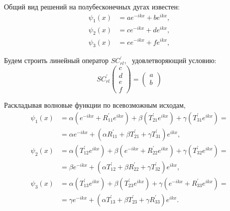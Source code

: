 \documentclass[a4 paper, 12 pt]{extarticle}
\begin{document}
   Общий вид решений на полубесконечных дугах известен:
   \begin{equation}
   \label{GeneralizedSolution1}
   \begin{split}
   \psi_1\left(x\right) &= a e^{-ikx} + b e^{ikx}, \\
   \psi_2\left(x\right) &= c e^{-ikx} + d e^{ikx}, \\
   \psi_3\left(x\right) &= e e^{-ikx} + f e^{ikx},
   \end{split}
   \end{equation}
   
   Будем строить линейный оператор $SC_{rl}^\prime$, \ удовлетворяющий условию:
   \[SC_{rl}^\prime\left(
   \begin{array}{c}
   c \\
   d \\
   e \\
   f
   \end{array}\right) = \left(\begin{array}{c}
   a \\
   b
   \end{array}\right)\]
   
   Раскладывая волновые функции по всевозможным исходам,
   \begin{equation}
   \label{GeneralizedSolution2}
   \begin{aligned}
   \psi_1(x) &= \alpha\left(e^{-ikx} + R_{11}^\prime e^{ikx}\right) + \beta\left(T_{21}^\prime e^{ikx}\right) + \gamma \left(T_{31}^\prime e^{ikx}\right) = \\
   &= \alpha e^{-ikx} + \left(\alpha R_{11}^\prime  + \beta T_{21}^\prime  + \gamma T_{31}^\prime \right) e^{ikx}, \\
   \psi_2(x) &= \alpha \left(T_{12}^\prime  e^{ikx}\right) + \beta \left(e^{-ikx} + R_{22}^\prime  e^{ikx}\right) + \gamma \left(T_{32}^\prime  e^{ikx}\right) = \\
   &= \beta e^{-ikx} + \left(\alpha T_{12}^\prime  + \beta R_{22}^\prime  + \gamma T_{32}^\prime \right) e^{ikx}, \\
   \psi_3(x) &= \alpha \left(T_{13}^\prime  e^{ikx}\right) + \beta \left(T_{23}^\prime  e^{ikx}\right) + \gamma \left(e^{-ikx} + R_{33}^\prime  e^{ikx}\right) = \\
   &= \gamma e^{-ikx} + \left(\alpha T_{13}^\prime  + \beta T_{23}^\prime  + \gamma R_{33}^\prime \right) e^{ikx}.
   \end{aligned}
   \end{equation}
   
\end{document}
